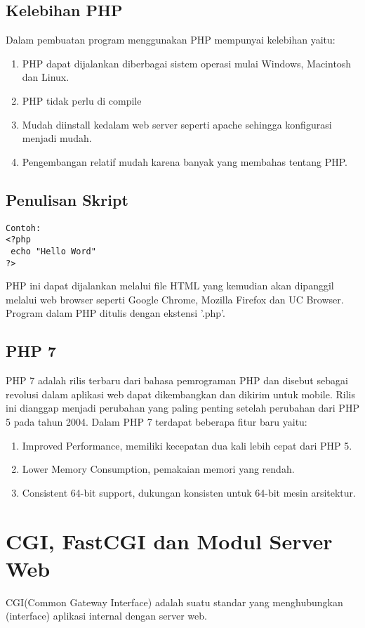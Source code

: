 \subsection{Kelebihan PHP}
Dalam pembuatan program menggunakan PHP mempunyai kelebihan yaitu:
\begin{enumerate}
\item PHP dapat dijalankan diberbagai sistem operasi mulai Windows, Macintosh dan Linux.
\item PHP tidak perlu di compile
\item Mudah diinstall kedalam web server seperti apache sehingga konfigurasi menjadi mudah.
\item Pengembangan relatif mudah karena banyak yang membahas tentang PHP.
\end{enumerate}

\subsection{Penulisan Skript}
\begin{lstlisting}
Contoh:
<?php
 echo "Hello Word"
?>
\end{lstlisting}
PHP ini dapat dijalankan melalui file HTML yang kemudian akan dipanggil melalui web browser seperti Google Chrome, Mozilla Firefox dan UC Browser.
Program dalam PHP ditulis dengan ekstensi '.php'.

\subsection{PHP 7}
PHP 7 adalah rilis terbaru dari bahasa pemrograman PHP dan disebut sebagai revolusi dalam aplikasi web dapat dikembangkan dan dikirim untuk mobile. Rilis ini dianggap menjadi perubahan yang paling penting setelah perubahan dari PHP 5 pada tahun 2004.
Dalam PHP 7 terdapat beberapa fitur baru yaitu:
\begin{enumerate}
\item Improved Performance, memiliki kecepatan dua kali lebih cepat dari PHP 5.
\item Lower Memory Consumption, pemakaian memori yang rendah.
\item Consistent 64-bit support, dukungan konsisten untuk 64-bit mesin arsitektur.
\end {enumerate}
\section{CGI, FastCGI dan Modul Server Web}
CGI(Common Gateway Interface) adalah suatu standar yang menghubungkan (interface) aplikasi internal dengan server web.  

